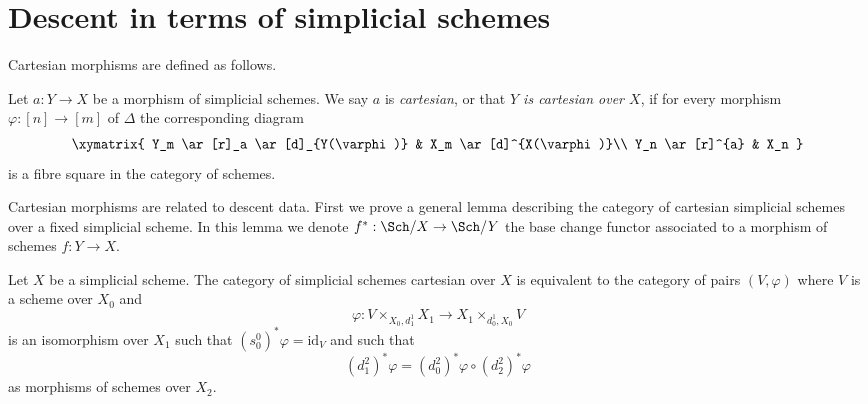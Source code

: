 \section{Descent in terms of simplicial schemes}
\label{section-simplicial-descent}

\noindent
Cartesian morphisms are defined as follows.

\begin{definition}
\label{definition-cartesian-morphism}
Let $a : Y \to X$ be a morphism of simplicial schemes.
We say $a$ is {\it cartesian}, or that {\it $Y$ is cartesian over $X$},
if for every morphism $\varphi : [n] \to [m]$ of $\Delta$ the corresponding
diagram
$$
\xymatrix{
Y_m \ar[r]_a \ar[d]_{Y(\varphi)} & X_m \ar[d]^{X(\varphi)}\\
Y_n \ar[r]^{a} & X_n
}
$$
is a fibre square in the category of schemes.
\end{definition}

\noindent
Cartesian morphisms are related to descent data. First we prove a general
lemma describing the category of cartesian simplicial schemes over a
fixed simplicial scheme. In this lemma we denote $f^* : \Sch/X \to \Sch/Y$
the base change functor associated to a morphism of schemes $f :Y \to X$.

\begin{lemma}
\label{lemma-characterize-cartesian-schemes}
Let $X$ be a simplicial scheme. The category of simplicial schemes cartesian
over $X$ is equivalent to the category of pairs $(V, \varphi)$
where $V$ is a scheme over $X_0$ and
$$
\varphi :
V \times_{X_0, d^1_1} X_1
\longrightarrow
X_1 \times_{d^1_0, X_0} V
$$
is an isomorphism over $X_1$ such that
$(s_0^0)^*\varphi = \text{id}_V$ and such that
$$
(d^2_1)^*\varphi = (d^2_0)^*\varphi \circ (d^2_2)^*\varphi
$$
as morphisms of schemes over $X_2$.
\end{lemma}

